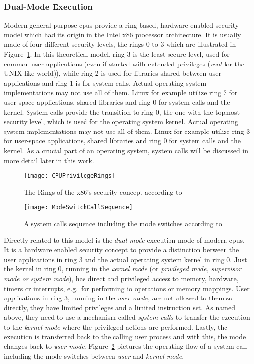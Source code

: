 \subsubsection*{Dual-Mode Execution}
Modern general purpose \acp{cpu} provide a ring based, hardware enabled security model which had its origin in the Intel x86 processor architecture\cite{tanenbaum-modern-operating-systems}.
It is usually made of four different security levels, the rings 0 to 3 which are illustrated in Figure~\ref{pic:x86rings}.
In this theoretical model, ring 3 is the least secure level, used for common user applications (even if started with extended privileges (\textit{root} for the UNIX-like world)), while ring 2 is used for libraries shared between user applications and ring 1 is for system calls\cite{glatz2015betriebssysteme}.
Actual operating system implementations may not use all of them.
Linux for example utilize ring 3 for user-space applications, shared libraries and ring 0 for system calls and the kernel.
System calls provide the transition to ring 0, the one with the topmost security level, which is used for the operating system kernel.
Actual operating system implementations may not use all of them.
Linux for example utilize ring 3 for user-space applications, shared libraries and ring 0 for system calls and the kernel.
As a crucial part of an operating system, system calls will be discussed in more detail later in this work.
%
\begin{figure} [t]
	\centering
	\texttt{[image: CPUPrivilegeRings]}
	\caption{The Rings of the x86's security concept according to~\cite{glatz2015betriebssysteme}}\label{pic:x86rings}
\end{figure}
%
\begin{figure} [t]
	\centering
	\texttt{[image: ModeSwitchCallSequence]}
    \caption{A system calls sequence including the mode switches according to~\cite{glatz2015betriebssysteme}}\label{pic:mode-switches}
\end{figure} %
%
Directly related to this model is the \textit{dual-mode} execution mode of modern \acp{cpu}.
It is a hardware enabled security concept to provide a distinction between the user applications in ring 3 and the actual operating system kernel in ring 0.
Just the kernel in ring 0, running in the \textit{kernel mode} (or \textit{privileged mode, supervisor mode or system mode}), has direct and privileged access to memory, hardware, timers or interrupts, e.g.\ for performing \ac{io} operations or memory mappings\cite{lfd430}.
User applications in ring 3, running in the \textit{user mode}, are not allowed to them so directly, they have limited privileges and a limited instruction set.
As named above, they need to use a mechanism called \textit{system calls} to transfer the execution to the \textit{kernel mode} where the privileged actions are performed.
Lastly, the execution is transferred back to the calling user process and with this, the mode changes back to \textit{user mode}.
Figure~\ref{pic:mode-switches} pictures the operating flow of a system call including the mode switches between \textit{user} and \textit{kernel mode}.


